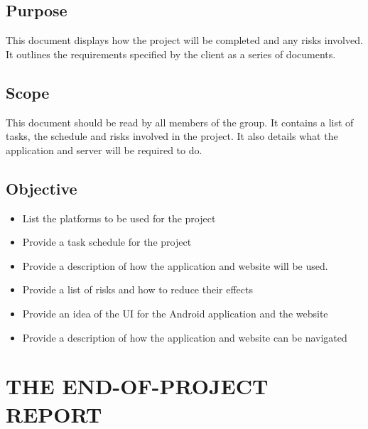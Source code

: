 \documentclass[12pt, portrait]{article}
\begin{document}
\subsection{Purpose}
This document displays how the project will be completed and any risks involved.  It outlines the requirements specified by the client as a series of documents.
\subsection{Scope}
This document should be read by all members of the group. It contains a list of tasks, the schedule and risks involved in the project. It also details what the application and server will be required to do.
\subsection{Objective}
\begin{itemize}
\item List the platforms to be used for the project
\item Provide a task schedule for the project 
\item Provide a description of how the application and website will be used.
\item Provide a list of risks and how to reduce their effects
\item Provide an idea of the UI for the Android application and the website
\item Provide a description of how the application and website can be navigated
\end{itemize}
\newpage
\section{THE END-OF-PROJECT REPORT}
\end{document}
